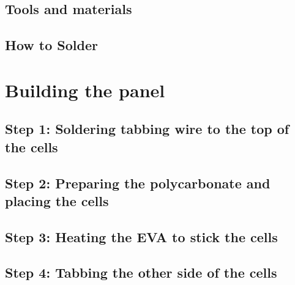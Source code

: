 \documentclass{article}
\theoremstyle{definition}
\theoremstyle{definition}
\theoremstyle{remark}
\begin{document}

  \subsection{Tools and materials} %
  \label{sub:tools_and_materials}
  

  \subsection{How to Solder} %
  \label{sub:how_to_solder}
  


\section{Building the panel} %
\label{sec:building_the_panel}

  \subsection{Step 1: Soldering tabbing wire to the top of the cells} %
  \label{sub:step_1_soldering_tabbing_wire_to_the_top_of_the_cells}
  

  \subsection{Step 2: Preparing the polycarbonate and placing the cells} %
  \label{sub:step_2_preparing_the_polycarbonate_and_placing_the_cells}
  

  \subsection{Step 3: Heating the EVA to stick the cells} %
  \label{sub:step_3_heating_the_eva_to_stick_the_cells}
  

  \subsection{Step 4: Tabbing the other side of the cells} %
  \label{sub:step_4_tabbing_the_other_side_of_the_cells}
  
\end{document}

